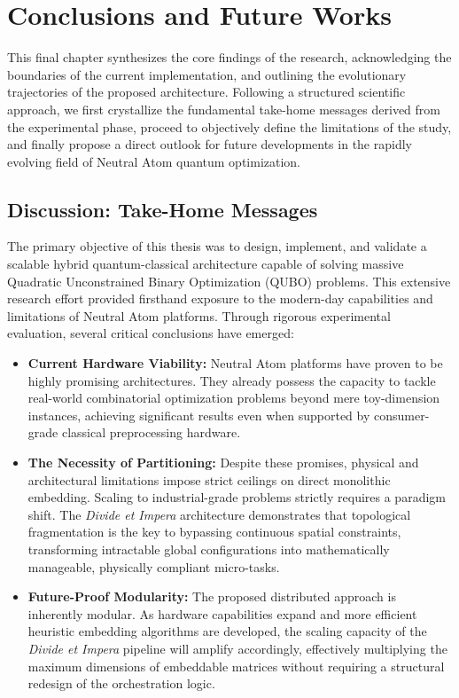\chapter{Conclusions and Future Works}
\label{chap:conclusions}

This final chapter synthesizes the core findings of the research, acknowledging the boundaries of the current implementation, and outlining the evolutionary trajectories of the proposed architecture. Following a structured scientific approach, we first crystallize the fundamental take-home messages derived from the experimental phase, proceed to objectively define the limitations of the study, and finally propose a direct outlook for future developments in the rapidly evolving field of Neutral Atom quantum optimization.

\section{Discussion: Take-Home Messages}
\label{sec:discussion}

The primary objective of this thesis was to design, implement, and validate a scalable hybrid quantum-classical architecture capable of solving massive Quadratic Unconstrained Binary Optimization (QUBO) problems. This extensive research effort provided firsthand exposure to the modern-day capabilities and limitations of Neutral Atom platforms. Through rigorous experimental evaluation, several critical conclusions have emerged:

\begin{itemize}
    \item \textbf{Current Hardware Viability:} Neutral Atom platforms have proven to be highly promising architectures. They already possess the capacity to tackle real-world combinatorial optimization problems beyond mere toy-dimension instances, achieving significant results even when supported by consumer-grade classical preprocessing hardware.
    
    \item \textbf{The Necessity of Partitioning:} Despite these promises, physical and architectural limitations impose strict ceilings on direct monolithic embedding. Scaling to industrial-grade problems strictly requires a paradigm shift. The \textit{Divide et Impera} architecture demonstrates that topological fragmentation is the key to bypassing continuous spatial constraints, transforming intractable global configurations into mathematically manageable, physically compliant micro-tasks.
    
    \item \textbf{Future-Proof Modularity:} The proposed distributed approach is inherently modular. As hardware capabilities expand and more efficient heuristic embedding algorithms are developed, the scaling capacity of the \textit{Divide et Impera} pipeline will amplify accordingly, effectively multiplying the maximum dimensions of embeddable matrices without requiring a structural redesign of the orchestration logic.
\end{itemize}

